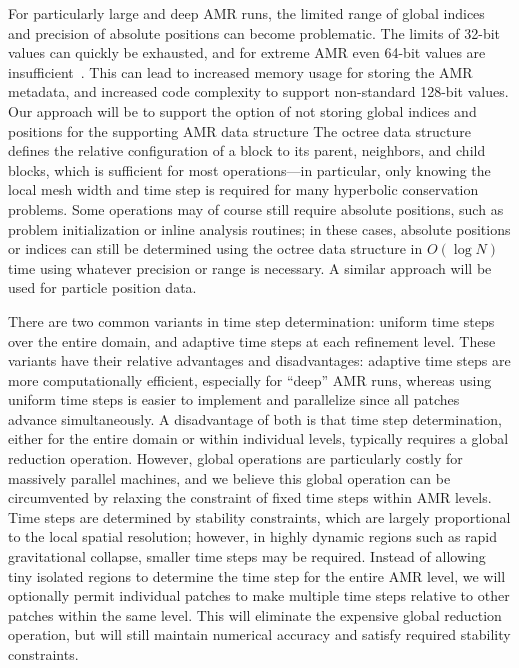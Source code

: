 \documentclass[11pt,letterpaper]{article}
\begin{document}
%
For particularly large and deep AMR runs, the limited range of global
indices and precision of absolute positions can become problematic.
The limits of 32-bit values can quickly be exhausted, and for extreme
AMR even 64-bit values are insufficient~\cite{BrAb01}.  This can lead
to increased memory usage for storing the AMR metadata, and increased
code complexity to support non-standard 128-bit values.  Our approach
will be to support the option of not storing global indices and
positions for the supporting AMR data structure
The octree data structure defines the
relative configuration of a block to its parent, neighbors, and child
blocks, which is sufficient for most operations---in particular, only
knowing the local mesh width and time step is required for many
hyperbolic conservation problems.  Some operations may of course still
require absolute positions, such as problem initialization or inline
analysis routines; in these cases, absolute positions or indices can
still be determined using the octree data structure in $O(\log N)$
time using whatever precision or range is necessary.  A similar
approach will be used for particle position data.


%
There are two common variants in time step determination: uniform time
steps over the entire domain, and adaptive time steps at each
refinement level.  These variants have their relative advantages and
disadvantages: adaptive time steps are more computationally efficient,
especially for ``deep'' AMR runs, whereas using uniform time steps is
easier to implement and parallelize since all patches advance
simultaneously.  A disadvantage of both is that time step
determination, either for the entire domain or within individual
levels, typically requires a global reduction operation.  However,
global operations are particularly costly for massively parallel
machines, and we believe this global operation can be circumvented by
relaxing the constraint of fixed time steps within AMR levels.
Time steps are determined by stability constraints, which are largely
proportional to the local spatial resolution; however, in highly
dynamic regions such as rapid gravitational collapse, smaller time
steps may be required.  Instead of allowing tiny isolated regions to
determine the time step for the entire AMR level, we will optionally
permit individual patches to make multiple time steps relative to
other patches within the same level.  This will eliminate the
expensive global reduction operation, but will still maintain
numerical accuracy and satisfy required stability constraints.
\end{document}
